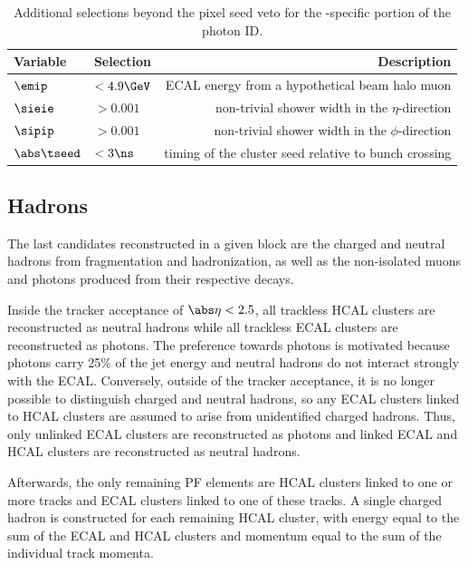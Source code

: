 \begin{table}[htbp]
  \begin{center}
    \begin{tabular}{l | l | r}
      Variable & Selection & Description \\
      \hline
      $\emip\ $ & $< 4.9\GeV$ & ECAL energy from a hypothetical beam halo muon \\
      $\sieie\ $ & $> 0.001$ & non-trivial shower width in the $\eta$-direction \\
      $\sipip\ $ & $> 0.001$ & non-trivial shower width in the $\phi$-direction \\
      $\abs\tseed $ & $< 3\ns$ & timing of the cluster seed relative to bunch crossing
    \end{tabular}
    \caption{Additional selections beyond the pixel seed veto for the \Pgg-specific portion of the photon ID.}
    \label{tab:gsid}
  \end{center}
\end{table}

\subsection{Hadrons}
\label{sec:pf_hadrons}

The last candidates reconstructed in a given block are the charged and neutral hadrons from fragmentation and hadronization, as well as the non-isolated muons and photons produced from their respective decays.

Inside the tracker acceptance of $\abs\eta < 2.5$, all trackless HCAL clusters are reconstructed as neutral hadrons while all trackless ECAL clusters are reconstructed as photons.
The preference towards photons is motivated because photons carry 25\% of the jet energy and neutral hadrons do not interact strongly with the ECAL.
Conversely, outside of the tracker acceptance, it is no longer possible to distinguish charged and neutral hadrons, so any ECAL clusters linked to HCAL clusters are assumed to arise from unidentified charged hadrons.
Thus, only unlinked ECAL clusters are reconstructed as photons and linked ECAL and HCAL clusters are reconstructed as neutral hadrons.

Afterwards, the only remaining PF elements are HCAL clusters linked to one or more tracks and ECAL clusters linked to one of these tracks.
A single charged hadron is constructed for each remaining HCAL cluster, with energy equal to the sum of the ECAL and HCAL clusters and momentum equal to the sum of the individual track momenta.

